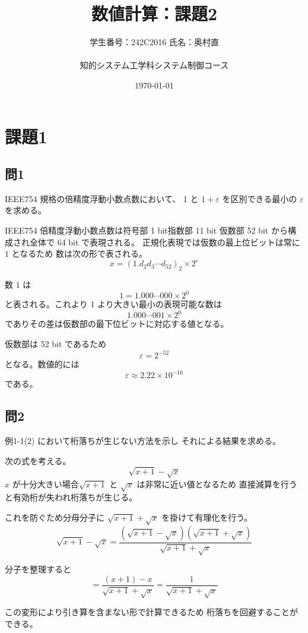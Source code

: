 \documentclass[10pt,a4paper,titlepage]{jreport} %
\title{数値計算：課題2} %
\author{
  学生番号：242C2016  氏名：奥村直 \\
  \\
  知的システム工学科システム制御コース
  } %
\date{\today} %
\begin{document}
\maketitle

\section*{課題1}

\subsection*{問1}
IEEE754 規格の倍精度浮動小数点数において、
1 と $1+\varepsilon$ を区別できる最小の $\varepsilon$ を求める。

IEEE754 倍精度浮動小数点数は符号部 1 bit指数部 11 bit
仮数部 52 bit から構成され全体で 64 bit で表現される。
正規化表現では仮数の最上位ビットは常に $1$ となるため
数は次の形で表される。
\[
x = (1.d_2 d_3 \cdots d_{52})_2 \times 2^e
\]

数 $1$ は
\[
1 = 1.000\cdots000 \times 2^0
\]
と表される。これより 1 より大きい最小の表現可能な数は
\[
1.000\cdots001 \times 2^0
\]
でありその差は仮数部の最下位ビットに対応する値となる。

仮数部は 52 bit であるため
\[
\varepsilon = 2^{-52}
\]
となる。数値的には
\[
\varepsilon \approx 2.22 \times 10^{-16}
\]
である。

\subsection*{問2}
例1-1(2) において桁落ちが生じない方法を示し
それによる結果を求める。

次の式を考える。
\[
\sqrt{x+1} - \sqrt{x}
\]
$x$ が十分大きい場合$\sqrt{x+1}$ と $\sqrt{x}$ は非常に近い値となるため
直接減算を行うと有効桁が失われ桁落ちが生じる。

これを防ぐため分母分子に
$\sqrt{x+1} + \sqrt{x}$ を掛けて有理化を行う。
\[
\sqrt{x+1} - \sqrt{x}
= \frac{(\sqrt{x+1}-\sqrt{x})(\sqrt{x+1}+\sqrt{x})}{\sqrt{x+1}+\sqrt{x}}
\]

分子を整理すると
\[
= \frac{(x+1)-x}{\sqrt{x+1}+\sqrt{x}}
= \frac{1}{\sqrt{x+1}+\sqrt{x}}
\]

この変形により引き算を含まない形で計算できるため
桁落ちを回避することができる。
\end{document}
